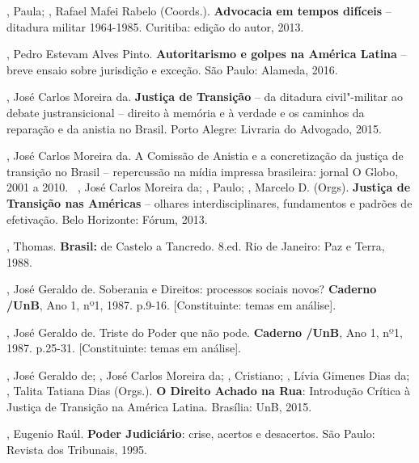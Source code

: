 , Paula; , Rafael Mafei Rabelo (Coords.).
\textbf{Advocacia em tempos difíceis} -- ditadura militar 1964-1985.
Curitiba: edição do autor, 2013.

, Pedro Estevam Alves Pinto. \textbf{Autoritarismo e golpes na
América Latina} -- breve ensaio sobre jurisdição e exceção. São Paulo:
Alameda, 2016.

 , José Carlos Moreira da. \textbf{Justiça de Transição} -- da
ditadura civil"-militar ao debate justransicional -- direito à memória e à
verdade e os caminhos da reparação e da anistia no Brasil. Porto Alegre:
Livraria do Advogado, 2015.

 , José Carlos Moreira da. A Comissão de Anistia e a
concretização da justiça de transição no Brasil -- repercussão na mídia
impressa brasileira: jornal O Globo, 2001 a 2010.~ , José
Carlos Moreira da; , Paulo; , Marcelo D. (Orgs).
\textbf{Justiça de Transição nas Américas} -- olhares interdisciplinares,
fundamentos e padrões de efetivação. Belo Horizonte: Fórum, 2013.

, Thomas. \textbf{Brasil:} de Castelo a Tancredo. 8.ed. Rio de
Janeiro: Paz e Terra, 1988.

 , José Geraldo de. Soberania e Direitos: processos sociais
novos? \textbf{Caderno /UnB}, Ano 1, nº1, 1987. p.9-16.
{[}Constituinte: temas em análise{]}.

 , José Geraldo de. Triste do Poder que não pode.
\textbf{Caderno /UnB}, Ano 1, nº1, 1987. p.25-31. {[}Constituinte:
temas em análise{]}.

 , José Geraldo de;  , José Carlos Moreira da;
, Cristiano; , Lívia Gimenes Dias da; , Talita
Tatiana Dias (Orgs.). \textbf{O Direito Achado na Rua}: Introdução
Crítica à Justiça de Transição na América Latina. Brasília: UnB, 2015.

, Eugenio Raúl. \textbf{Poder Judiciário}: crise, acertos e
desacertos. São Paulo: Revista dos Tribunais, 1995.
